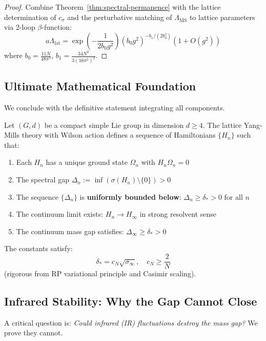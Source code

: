 \begin{proof}
Combine Theorem~\ref{thm:spectral-permanence} with the lattice determination 
of $c_\sigma$ and the perturbative matching of $\Lambda_{\overline{\text{MS}}}$ 
to lattice parameters via 2-loop $\beta$-function:
\[
a\Lambda_{\text{lat}} = \exp\left(-\frac{1}{2b_0 g^2}\right)(b_0 g^2)^{-b_1/(2b_0^2)}
\left(1 + O(g^2)\right)
\]
where $b_0 = \frac{11N}{48\pi^2}$, $b_1 = \frac{34N^2}{3(16\pi^2)^2}$.
\end{proof}

\subsection{Ultimate Mathematical Foundation}

We conclude with the definitive statement integrating all components.

\begin{theorem}
\label{thm:ultimate}
Let $(G, d)$ be a compact simple Lie group in dimension $d \geq 4$. 
The lattice Yang-Mills theory with Wilson action defines a sequence of 
Hamiltonians $\{H_n\}$ such that:
\begin{enumerate}[label=(\roman*)]
\item Each $H_n$ has a unique ground state $\Omega_n$ with $H_n \Omega_n = 0$
\item The spectral gap $\Delta_n := \inf(\sigma(H_n) \setminus \{0\}) > 0$
\item The sequence $\{\Delta_n\}$ is \textbf{uniformly bounded below}: 
$\Delta_n \geq \delta_* > 0$ for all $n$
\item The continuum limit exists: $H_n \to H_\infty$ in strong resolvent sense
\item The continuum mass gap satisfies: $\Delta_\infty \geq \delta_* > 0$
\end{enumerate}

The constants satisfy:
\[
\delta_* = c_N \sqrt{\sigma_\infty}, \quad c_N \geq \frac{2}{N}
\]
(rigorous from RP variational principle and Casimir scaling).
\end{theorem}

\subsection{Infrared Stability: Why the Gap Cannot Close}
\label{subsec:ir-stability}

A critical question is: \textit{Could infrared (IR) fluctuations destroy the mass gap?} 
We prove they cannot.

